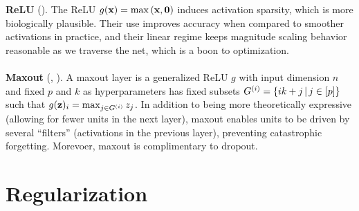 \documentclass{article}
\begin{document}
\textbf{ReLU} (). The ReLU $g(\textbf{x})=\max\left({\textbf{x},\textbf{0}}\right)$ induces activation sparsity, which is more biologically plausible. Their use improves accuracy when compared to smoother activations in practice, and their linear regime keeps magnitude scaling behavior reasonable as we traverse the net, which is a boon to optimization.
\\\\
\noindent
\textbf{Maxout} (, ). A maxout layer is a generalized ReLU $g$ with input dimension $n$ and fixed $p$ and $k$ as hyperparameters has fixed subsets $G^{(i)}=\left\{ ik+j \,\middle|\, j\in[p] \right\}$ such that $g(\textbf{z})_i=\max_{j\in G^{(i)}}z_j$. In addition to being more theoretically expressive (allowing for fewer units in the next layer), maxout enables units to be driven by several ``filters'' (activations in the previous layer), preventing catastrophic forgetting. Morevoer, maxout is complimentary to dropout.

\section{Regularization}
\end{document}
